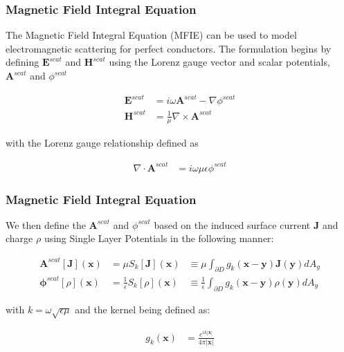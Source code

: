 \documentclass{beamer}
\newcommand{\bvec}[1]{\boldsymbol{#1}}
\begin{document}
	\begin{frame}
	\frametitle{Magnetic Field Integral Equation}
	The Magnetic Field Integral Equation (MFIE) can be used to model electromagnetic scattering for perfect conductors. The formulation begins by defining $\bvec{E}^{scat}$ and $\bvec{H}^{scat}$ using the Lorenz gauge vector and scalar potentials, $\bvec{A}^{scat}$ and $\phi^{scat}$
	
	\begin{align*}
	\bvec{E}^{scat} &= i \omega \bvec{A}^{scat} - \nabla \phi^{scat} \\
	\bvec{H}^{scat} &= \frac{1}{\mu} \nabla \times \bvec{A}^{scat}
	\end{align*}
	
	with the Lorenz gauge relationship defined as
	
	\begin{align*}
	\nabla \cdot \bvec{A}^{scat} &= i \omega \mu \epsilon \phi^{scat}
	\end{align*}
	
	\end{frame}

	\begin{frame}
	\frametitle{Magnetic Field Integral Equation}
	We then define the $\bvec{A}^{scat}$ and $\phi^{scat}$ based on the induced surface current $\bvec{J}$ and charge $\rho$ using Single Layer Potentials in the following manner:
	
	\begin{align*}
	\bvec{A}^{scat}[\bvec{J}](\bvec{x}) &= \mu S_k [\bvec{J}](\bvec{x}) & \equiv \mu \int_{\partial D} g_k(\bvec{x} - \bvec{y}) \bvec{J}(\bvec{y})dA_y \\
	\bvec{\phi}^{scat}[\rho](\bvec{x}) &=\frac{1}{\epsilon} S_k [\rho](\bvec{x}) & \equiv \frac{1}{\epsilon} \int_{\partial D} g_k(\bvec{x} - \bvec{y}) \rho(\bvec{y})dA_y
	\end{align*}
	
	with $k = \omega \sqrt{\epsilon \mu}$ and the kernel being defined as:
	
	\begin{align*}
	g_k(\bvec{x}) &= \frac{e^{i k |\bvec{x}|}}{4 \pi |\bvec{x}|}
	\end{align*}
	
	\end{frame}
\end{document}
